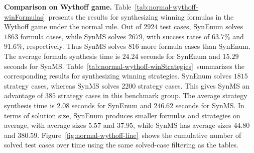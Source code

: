 \documentclass[review]{elsarticle}
\begin{document}
\textbf{Comparison on Wythoff game.}
Table~\ref{tab:normal-wythoff-winFormulas}~presents the results for synthesizing winning formulas in the Wythoff game under the normal rule.
Out of $2924$ test cases, SynEnum solves $1863$ formula cases, while SynMS solves $2679$, with success rates of $63.7\%$ and $91.6\%$, respectively.
Thus SynMS solves $816$ more formula cases than SynEnum.
The average formula synthesis time is $24.24$ seconds for SynEnum and $15.29$ seconds for SynMS.
Table~\ref{tab:normal-wythoff-winStrategies}~summarizes the corresponding results for synthesizing winning strategies.
SynEnum solves $1815$ strategy cases, whereas SynMS solves $2200$ strategy cases.
This gives SynMS an advantage of $385$ strategy cases in this benchmark group.
The average strategy synthesis time is $2.08$ seconds for SynEnum and $246.62$ seconds for SynMS.
In terms of solution size, SynEnum produces smaller formulas and strategies on average, with average sizes $5.57$ and $37.95$, while SynMS has average sizes $44.80$ and $380.59$.
Figure~\ref{fig:normal-wythoff-line}~shows the cumulative number of solved test cases over time using the same solved-case filtering as the tables.
\end{document}
